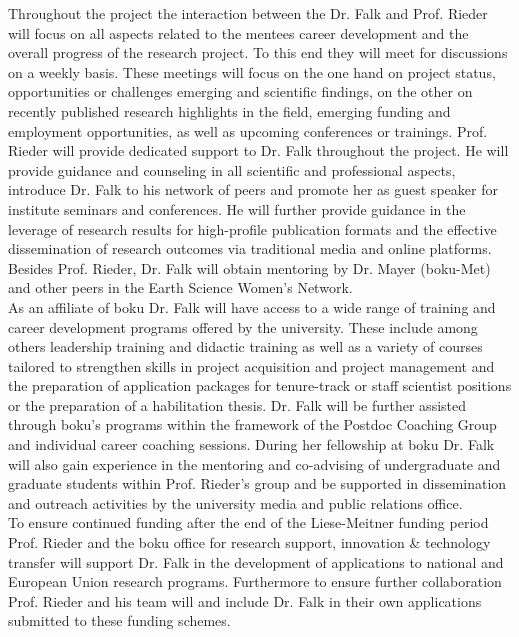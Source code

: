 Throughout the project the interaction between the Dr. Falk and Prof. Rieder will focus on all aspects related to the mentees career development and the overall progress of the research project. To this end they will meet for discussions on a weekly basis. These meetings will focus on the one hand on project status, opportunities or challenges emerging and scientific findings, on the other on recently published research highlights in the field, emerging funding and employment opportunities, as well as upcoming conferences or trainings. Prof. Rieder will provide dedicated support to Dr. Falk throughout the project. He will provide guidance and counseling in all scientific and professional aspects, introduce Dr. Falk to his network of peers and promote her as guest speaker for institute seminars and conferences. He will further provide guidance in the leverage of research results for high-profile publication formats and the effective dissemination of research outcomes via traditional media and online platforms. Besides Prof. Rieder, Dr. Falk will obtain mentoring by Dr. Mayer (\gls{boku}-Met) and other peers in the Earth Science Women’s Network.\\
As an affiliate of \gls{boku} Dr. Falk will have access to a wide range of training and career development programs offered by the university. These include among others leadership training and didactic training as well as a variety of courses tailored to strengthen skills in project acquisition and project management and the preparation of application packages for tenure-track or staff scientist positions or the preparation of a habilitation thesis. Dr. Falk will be further assisted through \gls{boku}’s programs within the framework of the Postdoc Coaching Group and individual career coaching sessions. During her fellowship at \gls{boku} Dr. Falk will also gain experience in the mentoring and co-advising of undergraduate and graduate students within Prof. Rieder’s group and be supported in dissemination and outreach activities by the university media and public relations office.\\
To ensure continued funding after the end of the Liese-Meitner funding period Prof. Rieder and the \gls{boku} office for research support, innovation \& technology transfer will support Dr. Falk in the development of applications to national and European Union research programs. Furthermore to ensure further collaboration Prof. Rieder and his team will and include Dr. Falk in their own applications submitted to these funding schemes.     
